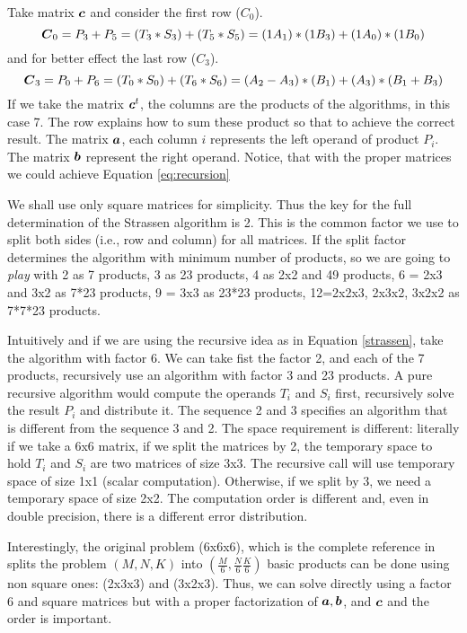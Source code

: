 \documentclass[acmsmall]{acmart}
\begin{document}
Take matrix ${\boldsymbol c}$ and consider the first row ($C_0$).
\begin{equation}
  {\boldsymbol C}_0 = P_3+P_5 = (T_3*S_3) + (T_5*S_5) = (1A_1)*(1B_3) + (1A_0)*(1B_0)
\end{equation}
and for better effect the last row ($C_3$).
\begin{equation}
  {\boldsymbol C}_3 = P_0+P_6 = (T_0*S_0) + (T_6*S_6) = (A_2-A_3)*(B_1) + (A_3)*(B_1+B_3)
\end{equation}
If we take the matrix ${\boldsymbol c}^t$, the columns are the products of the
algorithms, in this case 7. The row explains how to sum these product
so that to achieve the correct result. The matrix ${\boldsymbol a}$, each
column $i$ represents the left operand of product $P_i$. The matrix
${\boldsymbol b}$ represent the right operand. Notice, that with the proper
matrices we could achieve Equation \ref{eq:recursion} 




We shall use only square matrices for simplicity. Thus the key for the
full determination of the Strassen algorithm is 2. This is the common
factor we use to split both sides (i.e., row and column) for all
matrices. If the split factor determines the algorithm with minimum
number of products, so we are going to {\em play} with 2 as 7
products, 3 as 23 products, 4 as 2x2 and 49 products, 6 = 2x3 and 3x2
as 7*23 products, 9 = 3x3 as 23*23 products, 12=2x2x3, 2x3x2, 3x2x2 as
7*7*23 products.

Intuitively and if we are using the recursive idea as in Equation
\ref{strassen}, take the algorithm with factor 6. We can take fist the
factor 2, and each of the 7 products, recursively use an algorithm
with factor 3 and 23 products. A pure recursive algorithm would
compute the operands $T_i$ and $S_i$ first, recursively solve the
result $P_i$ and distribute it. The sequence 2 and 3 specifies an
algorithm that is different from the sequence 3 and 2.  The space
requirement is different: literally if we take a 6x6 matrix, if we
split the matrices by 2, the temporary space to hold $T_i$ and $S_i$
are two matrices of size 3x3. The recursive call will use temporary
space of size 1x1 (scalar computation). Otherwise, if we split by 3,
we need a temporary space of size 2x2. The computation order is
different and, even in double precision, there is a different error
distribution.

Interestingly, the original problem (6x6x6), which is the complete
reference in \cite{PMID:36198780} splits the problem $(M,N,K)$ into
$(\frac{M}{6},\frac{N}{6}\frac{K}{6})$ basic products can be done
using non square ones: (2x3x3) and (3x2x3). Thus, we can solve
directly using a factor 6 and square matrices but with a proper
factorization of ${\boldsymbol a},{\boldsymbol b}$, and ${\boldsymbol c}$ and the order is
important.
\end{document}

